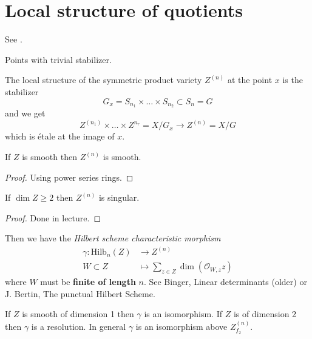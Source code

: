 \section{Local structure of quotients}
\label{section-local-structure-of-quotients}

See \cite{AVar}.

\begin{definition}
\label{definition-free-locus}
Points with trivial stabilizer.
\end{definition}

The local structure of  the symmetric product variety $Z^{(n)}$ 
at the point $x$ is the stabilizer
$$
G_x=S_{n_1}\times\ldots\times S_{n_2}\subset S_n=G
$$
and we get
$$
Z^{(n_1)}\times\ldots\times Z^{n_r} = X/G_x \to Z^{(n)}=X/G
$$
which is étale at the image of $x$.

\begin{proposition}
\label{proposition-variety-smooth-then-symmetric-product-smooth}
If $Z$ is smooth then $Z^{(n)}$ is smooth.
\end{proposition}

\begin{proof}
Using power series rings.
\end{proof}

\begin{proposition}
\label{proposition-simension-geq2-then-symmetric-product-singular}
If $\dim Z \geq 2$ then $Z^{(n)}$ is singular.
\end{proposition}

\begin{proof}
Done in lecture.
\end{proof}

\medskip\noindent
Then we have the {\it Hilbert scheme characteristic morphism}
\begin{align*}
\gamma: \text{Hilb}_n(Z) &\longrightarrow Z^{(n)} \\
W\subset Z &\longmapsto \sum_{z \in Z}\dim (\mathcal{O}_{W,z}z)
\end{align*}
where $W$ must be {\bf finite of length }$n$. See Binger, Linear determinants
(older) or J. Bertin, The punctual Hilbert Scheme.

If $Z$ is smooth of dimension 1 then $\gamma$ is an isomorphism. If $Z$ is of
dimension 2 then $\gamma$ is a resolution. In general $\gamma$ is an isomorphism
above $Z_{f_2}^{(n)}$.

